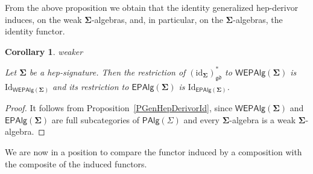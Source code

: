 \documentclass[a4paper, reqno]{amsbook}
\makeatletter
\newcommand{\sig}[1]{\mathbf{#1}}             %
\newcommand{\gd}{\mathfrak{gd}}              %
\newcommand{\id}{\mathrm{id}}
\newcommand{\Id}{\mathrm{Id}}
\theoremstyle{plain}
\newtheorem{corollary}[theorem]{Corollary}
\theoremstyle{definition}
\newcommand*{\CA@leanpending}{}
\newcommand*{\CA@leanrelation}{}
\newcommand*{\lean}[2]{%
  \ifcsname\string\color@lean@#1\endcsname\else
    \PackageError{main}{Unknown relation `#1' in \string\lean}{Use equivalent, weaker or stronger.}%
  \fi
  \gdef\CA@leanrelation{#1}%
  \gdef\CA@leanpending{#2}}
\makeatother
\begin{document}
From the above proposition we obtain that the identity generalized hep-derivor induces, on the weak $\sig{\Sigma}$-algebras, and, in particular, on the $\sig{\Sigma}$-algebras, the identity functor.

\begin{corollary}\label{CGenHepDerivorIdFunctor}\lean{weaker}{GeneralizedHepDerivor.epIdentityIso}
Let $\sig{\Sigma}$ be a hep-signature.
Then the restriction of $(\id_{\sig{\Sigma}})^{\ast}_{\gd}$ to $\mathsf{WEPAlg}(\sig{\Sigma})$ is $\Id_{\mathsf{WEPAlg}(\sig{\Sigma})}$ and its restriction to $\mathsf{EPAlg}(\sig{\Sigma})$ is $\Id_{\mathsf{EPAlg}(\sig{\Sigma})}$.
\end{corollary}
\begin{proof}
It follows from Proposition~\ref{PGenHepDerivorId}, since $\mathsf{WEPAlg}(\sig{\Sigma})$ and $\mathsf{EPAlg}(\sig{\Sigma})$ are full subcategories of $\mathsf{PAlg}(\Sigma)$ and every $\sig{\Sigma}$-algebra is a weak $\sig{\Sigma}$-algebra.
\end{proof}

We are now in a position to compare the functor induced by a composition with the composite of the induced functors.
\end{document}
